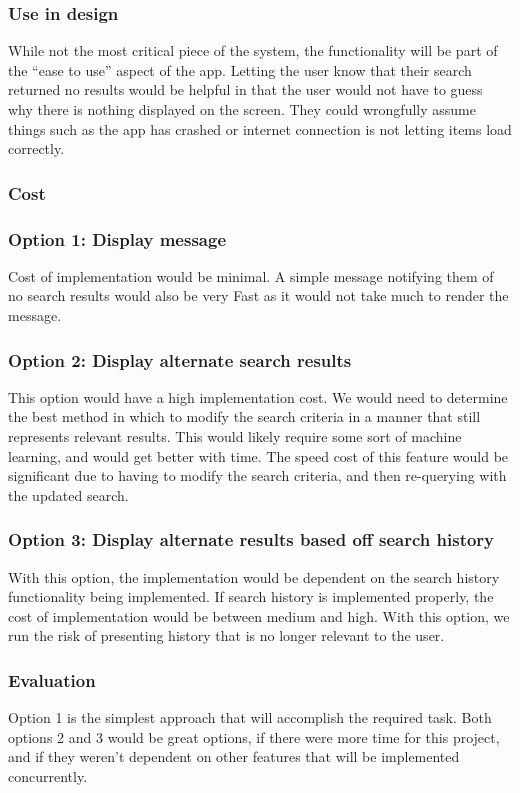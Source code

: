 \documentclass[journal,compsoc, 10pt, draftclsnofoot, onecolumn]{IEEEtran}
\begin{document}
\subsubsection{Use in design}
While not the most critical piece of the system, the functionality will be part 
of the ``ease to use'' aspect of the app. Letting the user know that their 
search returned no results would be helpful in that the user would not have to 
guess why there is nothing displayed on the screen. They could wrongfully 
assume things such as the app has crashed or internet connection is not 
letting items load correctly.
\subsubsection{Cost}
\subsubsection*{Option 1: Display message}
Cost of implementation would be minimal. A simple message notifying them of no 
search results would also be very Fast as it would not take much to render the 
message. 
\subsubsection*{Option 2: Display alternate search results}
This option would have a high implementation cost. We would need to determine 
the best method in which to modify the search criteria in a manner that still 
represents relevant results. This would likely require some sort of machine 
learning, and would get better with time. The speed cost of this feature would 
be significant due to having to modify the search criteria, and then 
re-querying with the updated search.
\subsubsection*{Option 3: Display alternate results based off search history}
With this option, the implementation would be dependent on the search history 
functionality being implemented. If search history is implemented properly, 
the cost of implementation would be between medium and high. With this option, 
we run the risk of presenting history that is no longer relevant to the user. 
\subsubsection{Evaluation}
Option 1 is the simplest approach that will accomplish the required task. Both options 2 and 3 would be great options, if there were more time for this project, and if they weren't dependent on other features that will be implemented concurrently.
\end{document}
